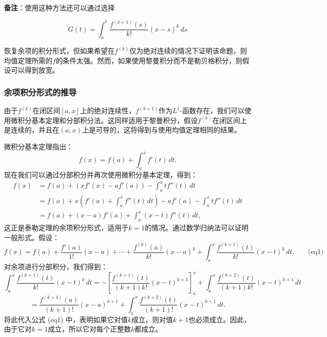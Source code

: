 \textbf{备注}：使用这种方法还可以通过选择

\[
G(t) = \int_a^t \frac{f^{(k+1)}(s)}{k!} (x - s)^k \, ds~
\]

恢复余项的积分形式，但如果希望在\( f^{(k)} \)仅为绝对连续的情况下证明该命题，则均值定理所需的\( f \)的条件太强。然而，如果使用黎曼积分而不是勒贝格积分，则假设可以得到放宽。
\subsubsection{余项积分形式的推导}  
由于\( f^{(k)} \)在闭区间\( [a, x] \)上的绝对连续性，\( f^{(k+1)} \)作为\( L^1 \)-函数存在，我们可以使用微积分基本定理和分部积分法。这同样适用于黎曼积分，假设\( f^{(k)} \)在闭区间上是连续的，并且在\( (a, x) \)上是可导的，这将得到与使用均值定理相同的结果。

微积分基本定理指出：
\[
f(x) = f(a) + \int_a^x f'(t) \, dt.~
\]
现在我们可以通过分部积分并再次使用微积分基本定理，得到：
\[
\begin{aligned}
f(x) &= f(a) + \left( x f'(x) - a f'(a) \right) - \int_a^x t f''(t) \, dt\\ 
&= f(a) + x \left( f'(a) + \int_a^x f''(t) \, dt \right) - a f'(a) - \int_a^x t f''(t) \, dt\\
&= f(a) + (x - a) f'(a) + \int_a^x (x - t) f''(t) \, dt,
\end{aligned}~
\]
这正是泰勒定理的余项积分形式，适用于\( k = 1 \)的情况。通过数学归纳法可以证明一般形式。假设：
\[
f(x) = f(a) + \frac{f'(a)}{1!} (x - a) + \cdots + \frac{f^{(k)}(a)}{k!} (x - a)^k + \int_a^x \frac{f^{(k+1)}(t)}{k!} (x - t)^k \, dt.\qquad \text{(eq1)}~
\]
对余项进行分部积分，我们得到：
\[
\int_a^x \frac{f^{(k+1)}(t)}{k!} (x - t)^k \, dt = -\left[ \frac{f^{(k+1)}(t)}{(k+1)k!} (x - t)^{k+1} \right]_a^x + \int_a^x \frac{f^{(k+2)}(t)}{(k+1)k!} (x - t)^{k+1} \, dt~
\]
\[
= \frac{f^{(k+1)}(a)}{(k+1)!} (x - a)^{k+1} + \int_a^x \frac{f^{(k+2)}(t)}{(k+1)!} (x - t)^{k+1} \, dt.~
\]
将此代入公式 (eq1) 中，表明如果它对值\( k \)成立，则对值\( k + 1 \)也必须成立。因此，由于它对\( k = 1 \)成立，所以它对每个正整数\( k \)都成立。